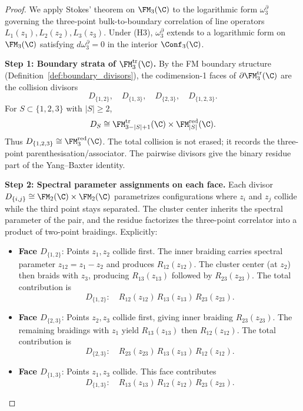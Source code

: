 \begin{proof}
We apply Stokes' theorem on $\FM_3(\C)$ to the logarithmic form $\omega_3^{\partial}$ governing the three-point bulk-to-boundary correlation of line operators $L_1(z_1), L_2(z_2), L_3(z_3)$. Under (H3), $\omega_3^{\partial}$ extends to a logarithmic form on $\FM_3(\C)$ satisfying $d\omega_3^{\partial} = 0$ in the interior $\Conf_3(\C)$.

\medskip
\noindent\textbf{Step 1: Boundary strata of \(\FM^{\mathrm{tr}}_3(\C)\).}
By the FM boundary structure (Definition~\ref{def:boundary_divisors}), the codimension-1 faces of \(\partial\FM^{\mathrm{tr}}_3(\C)\) are the collision divisors
\[
D_{\{1,2\}},\quad D_{\{1,3\}},\quad D_{\{2,3\}},\quad D_{\{1,2,3\}}.
\]
For \(S\subset\{1,2,3\}\) with \(|S|\ge2\),
\[
D_S\cong
\FM^{\mathrm{tr}}_{3-|S|+1}(\C)\times
\FM^{\mathrm{red}}_{|S|}(\C).
\]
Thus \(D_{\{1,2,3\}}\cong\FM^{\mathrm{red}}_3(\C)\).  The total
collision is not erased; it records the three-point
parenthesisation/associator.  The pairwise divisors give the binary
residue part of the Yang--Baxter identity.

\medskip
\noindent\textbf{Step 2: Spectral parameter assignments on each face.}
Each divisor $D_{\{i,j\}} \cong \FM_2(\C) \times \FM_2(\C)$ parametrizes configurations where $z_i$ and $z_j$ collide while the third point stays separated. The cluster center inherits the spectral parameter of the pair, and the residue factorizes the three-point correlator into a product of two-point braidings. Explicitly:

\begin{itemize}
\item \textbf{Face $D_{\{1,2\}}$}: Points $z_1, z_2$ collide first. The inner braiding carries spectral parameter $z_{12} = z_1 - z_2$ and produces $R_{12}(z_{12})$. The cluster center (at $z_2$) then braids with $z_3$, producing $R_{13}(z_{13})$ followed by $R_{23}(z_{23})$. The total contribution is
\[
D_{\{1,2\}}: \quad R_{12}(z_{12})\, R_{13}(z_{13})\, R_{23}(z_{23}).
\]

\item \textbf{Face $D_{\{2,3\}}$}: Points $z_2, z_3$ collide first, giving inner braiding $R_{23}(z_{23})$. The remaining braidings with $z_1$ yield $R_{13}(z_{13})$ then $R_{12}(z_{12})$. The total contribution is
\[
D_{\{2,3\}}: \quad R_{23}(z_{23})\, R_{13}(z_{13})\, R_{12}(z_{12}).
\]

\item \textbf{Face $D_{\{1,3\}}$}: Points $z_1, z_3$ collide. This face contributes
\[
D_{\{1,3\}}: \quad R_{13}(z_{13})\, R_{12}(z_{12})\, R_{23}(z_{23}).
\]
\end{itemize}


\end{proof}
